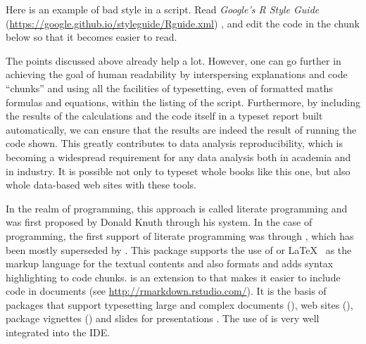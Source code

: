 \documentclass[krantz2]{krantz}\usepackage{knitr}
\newcommand{\href}[2]{\emph{#2} (\url{#1})}
\begin{document}
\begin{playground}
Here is an example of bad style in a script. Read \href{https://google.github.io/styleguide/Rguide.xml}{Google's R Style Guide}%
, and edit the code in the chunk below so that it becomes easier to read.

\begin{knitrout}\footnotesize
{}\color{fgcolor}\begin{kframe}
\begin{alltt}
 \hlkwb{<-}  
 \hlkwb{<-}  
 \hlkwb{<-}
     \hlopt{*}
 \hlkwb{->} 
      \hlstd{(}
\hlstd{)}
\end{alltt}
\end{kframe}
\end{knitrout}
\end{playground}

The points discussed above already help a lot. However, one can go further in achieving the goal of human readability by interspersing explanations and code ``chunks'' and using all the facilities of typesetting, even of formatted maths formulas and equations, within the listing of the script. Furthermore, by including the results of the calculations and the code itself in a typeset report built automatically, we can ensure that the results are indeed the result of running the code shown. This greatly contributes to data analysis reproducibility, which is becoming a widespread requirement for any data analysis both in academia and in industry. It is possible not only to typeset whole books like this one, but also whole data-based web sites with these tools.

In the realm of programming, this approach is called literate programming and was first proposed by Donald Knuth \autocite{Knuth1984a} through his  system. In the case of \Rpgrm programming, the first support of literate programming was through , which has been mostly superseded by  \autocite{Xie2013}. This package supports the use of  or \LaTeX{}\ \autocite{Lamport1994} as the markup language for the textual contents and also formats and adds syntax highlighting to code chunks.  is an extension to  that makes it easier to include \Rlang code in documents (see \url{http://rmarkdown.rstudio.com/}). It is the basis of \Rlang packages that support typesetting large and complex documents (), web sites (), package vignettes () and slides for presentations \autocite{Xie2016,Xie2018}. The use of  is very well integrated into the \RStudio IDE.
\end{document}
